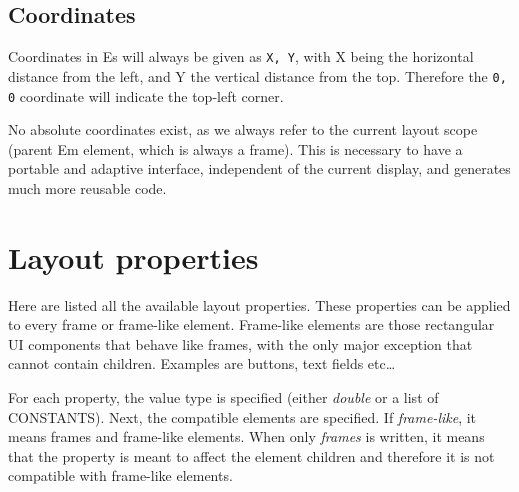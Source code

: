 \subsection{Coordinates}

Coordinates in Es will always be given as \verb|X, Y|, with X being the horizontal distance from the left, and Y the vertical distance from the top. Therefore the \verb|0, 0| coordinate will indicate the top-left corner.

No absolute coordinates exist, as we always refer to the current layout scope (parent Em element, which is always a frame). This is necessary to have a portable and adaptive interface, independent of the current display, and generates much more reusable code.

\section{Layout properties}
\label{ex:layout_properties}

Here are listed all the available layout properties. These properties can be applied to every frame or frame-like element. Frame-like elements are those rectangular UI components that behave like frames, with the only major exception that cannot contain children. Examples are buttons, text fields etc\ldots

For each property, the value type is specified (either \textit{double} or a list of CONSTANTS). Next, the compatible elements are specified. If \textit{frame-like}, it means frames and frame-like elements. When only \textit{frames} is written, it means that the property is meant to affect the element children and therefore it is not compatible with frame-like elements.

